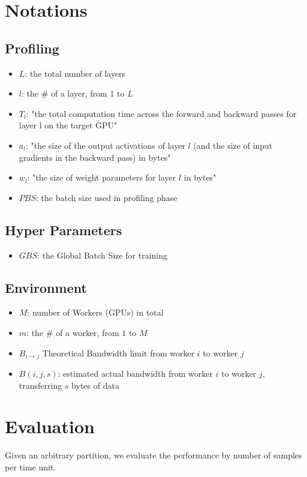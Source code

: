 \documentclass[12pt,letterpaper]{article}
\begin{document}
    \section {Notations}
    \subsection {Profiling}
    \begin{itemize}
        \item $L$: the total number of layers
        \item $l$: the \# of a layer, from $1$ to $L$
        \item $T_l$: "the total computation time across the forward and backward passes for layer l on the target GPU"
        \item $a_l$: "the size of the output activations of layer $l$ (and the size of input gradients in the backward pass) in bytes"
        \item $w_l$: "the size of weight parameters for layer $l$ in bytes"
        \item $PBS$: the batch size used in profiling phase
    \end{itemize}
    \subsection {Hyper Parameters}
    \begin{itemize}
        \item $GBS$: the Global Batch Size for training
    \end{itemize}
    \subsection {Environment}
    \begin{itemize}
        \item $M$: number of Workers (GPUs) in total
        \item $m$: the \# of a worker, from $1$ to $M$
        \item $B_{i \rightarrow j}$ Theoretical Bandwidth limit from worker $i$ to worker $j$
        \item $B(i,j,s)$: estimated actual bandwidth from worker $i$ to worker $j$, transferring $s$ bytes of data
    \end{itemize}

    \section* {Evaluation}
    Given an arbitrary partition, we evaluate the performance by number of samples per time unit.
\end{document}
